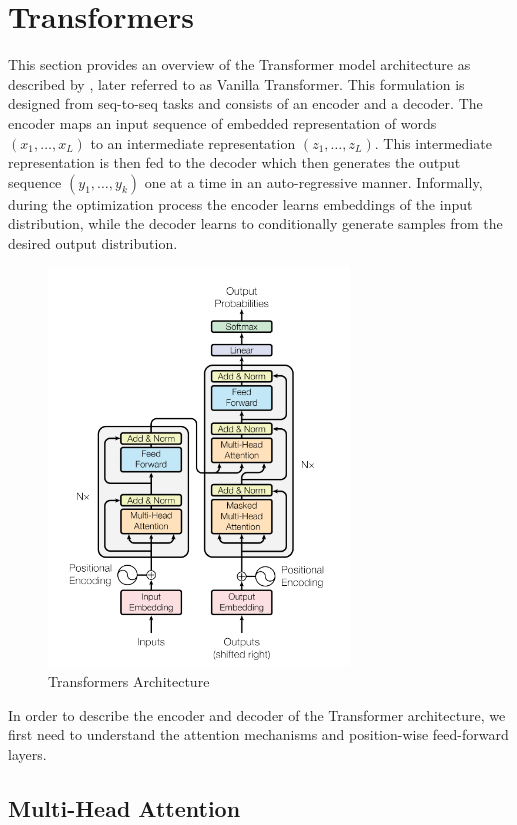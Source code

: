 \section{Transformers}

This section provides an overview of the Transformer model architecture as described by \cite{vaswani2023attention}, later referred to as Vanilla Transformer. This formulation is designed from seq-to-seq tasks and consists of an encoder and a decoder. The encoder maps an input sequence  of embedded representation of words $(x_1, \ldots, x_L)$ to an intermediate representation $(z_1, \ldots, z_L)$. This intermediate representation is then fed to the decoder which then generates the output sequence $(y_1, \dots, y_k)$ one at a time in an auto-regressive manner. Informally, during the optimization process the encoder learns embeddings of the input distribution, while the decoder learns to conditionally generate samples from the desired output distribution.

\begin{figure}[h]
\includegraphics[width=8cm]{images/vanilla-arch.png}
\centering
\caption{Transformers Architecture}
\label{fig:vanilla-arch}
\end{figure}

In order to describe the encoder and decoder of the Transformer architecture, we first need to understand the attention mechanisms and position-wise feed-forward layers.

\subsection{Multi-Head Attention}

